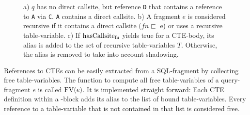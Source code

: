 \begin{figure}[h]
    \small
    \centering
    \caption{a) $q$ has no direct callsite, but reference \texttt{D} that contains a reference to \texttt{A} via \texttt{C}. \texttt{A} contains a direct callsite. b) A fragment $e$ is considered recursive if it contains a direct callsite ($fn \sqsubset$ e) or uses a recursive table-variable. c) If $\operatorname{\text{hasCallsite}_{fn}}$ yields true for a CTE-body, its alias is added to the set of recursive table-variables $T$. Otherwise, the alias is removed to take into account shadowing.}
    \label{fig:tracking_recursive_ctes}
\end{figure}

References to CTEs can be easily extracted from a SQL-fragment by collecting free table-variables. The function to compute all free table-variables of a query-fragment $e$ is called $\operatorname{\text{\rm FV}}(e)$. It is implemented straight forward: Each CTE definition within a \WITH-block adds its alias to the list of bound table-variables. Every reference to a table-variable that is not contained in that list is considered free.


